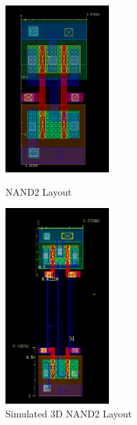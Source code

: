 \documentclass{article}
\begin{document}
\begin{figure}[h]
\centering
\parbox{8cm}{
\includegraphics[width=4cm]{step3}
  \caption{NAND2 Layout}
\label{step3}}
\qquad
\begin{minipage}{7cm}
\includegraphics[width=4cm]{3d_layout}
  \caption{Simulated 3D NAND2 Layout}
\label{3d_layout}
\end{minipage}
\end{figure}
\end{document}
